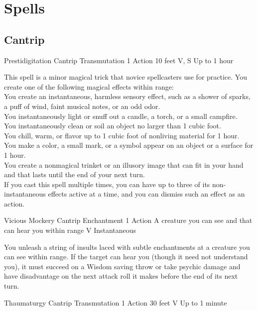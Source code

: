 \documentclass[letterpaper,openany,oneside,twocolumn]{book}
\begin{document}
\section*{Spells}
\subsection*{Cantrip}

\DndSpellHeader
  {Prestidigitation}
  {Cantrip Transmutation}
  {1 Action}
  {10 feet}
  {V, S}
  {Up to 1 hour}

This spell is a minor magical trick that novice spellcasters use for practice. You create one of the following magical effects within range:\\
You create an instantaneous, harmless sensory effect, such as a shower of sparks, a puff of wind, faint musical notes, or an odd odor.\\
You instantaneously light or snuff out a candle, a torch, or a small campfire.\\
You instantaneously clean or soil an object no larger than 1 cubic foot.\\
You chill, warm, or flavor up to 1 cubic foot of nonliving material for 1 hour.\\
You make a color, a small mark, or a symbol appear on an object or a surface for 1 hour.\\
You create a nonmagical trinket or an illusory image that can fit in your hand and that lasts until the end of your next turn.\\
If you cast this spell multiple times, you can have up to three of its non-instantaneous effects active at a time, and you can dismiss such an effect as an action.

\DndSpellHeader
  {Vicious Mockery}
  {Cantrip Enchantment}
  {1 Action}
  {A creature you can see and that can hear you within range}
  {V}
  {Instantaneous}

You unleash a string of insults laced with subtle enchantments at a creature you can see within range. If the target can hear you (though it need not understand you), it must succeed on a Wisdom saving throw or take  psychic damage and have disadvantage on the next attack roll it makes before the end of its next turn.

\DndSpellHeader
  {Thaumaturgy}
  {Cantrip Transmutation}
  {1 Action}
  {30 feet}
  {V}
  {Up to 1 minute}
\end{document}
